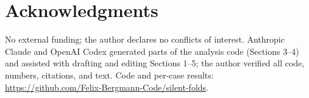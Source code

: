 \documentclass{article}
\begin{document}
\section{Acknowledgments}
\label{sec:acknowledgments}

No external funding; the author declares no conflicts of interest. Anthropic
Claude and OpenAI Codex generated parts of the analysis code (Sections 3--4)
and assisted with drafting and editing Sections 1--5; the author verified all
code, numbers, citations, and text. Code and per-case results:
\url{https://github.com/Felix-Bergmann-Code/silent-folds}.

\vspace{-1mm}


\end{document}
